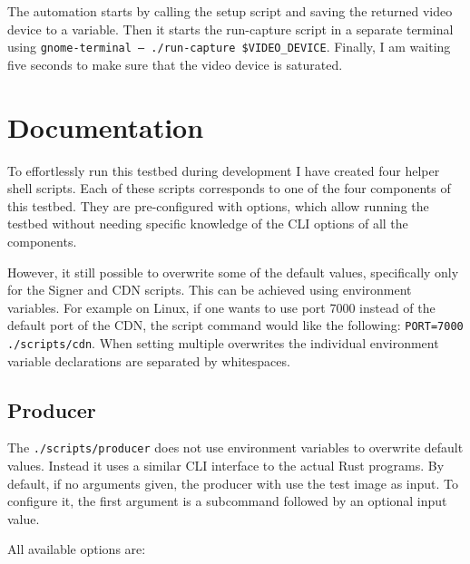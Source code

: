The automation starts by calling the setup script and saving the returned video device to a variable. Then it starts the run-capture script in a separate terminal using \texttt{gnome-terminal -- ./run-capture \$VIDEO\_DEVICE}. Finally, I am waiting five seconds to make sure that the video device is saturated. 

\section{Documentation\label{sec:docu}}

To effortlessly run this testbed during development I have created four helper shell scripts. Each of these scripts corresponds to one of the four components of this testbed. They are pre-configured with options, which allow running the testbed without needing specific knowledge of the CLI options of all the components. 

However, it still possible to overwrite some of the default values, specifically only for the Signer and CDN scripts. This can be achieved using environment variables. For example on Linux, if one wants to use port 7000 instead of the default port of the CDN, the script command would like the following: \texttt{PORT=7000 ./scripts/cdn}. When setting multiple overwrites the individual environment variable declarations are separated by whitespaces.

\subsection{Producer}

The \texttt{./scripts/producer} does not use environment variables to overwrite default values. Instead it uses a similar CLI interface to the actual Rust programs. By default, if no arguments given, the producer with use the test image as input. To configure it, the first argument is a subcommand followed by an optional input value. 

All available options are:


